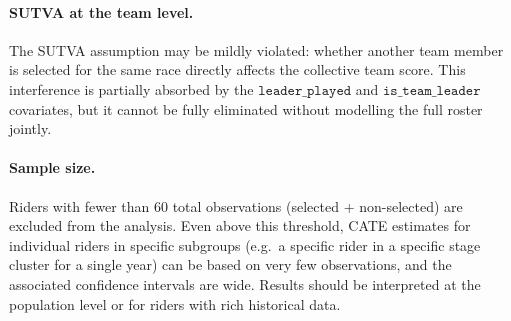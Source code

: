 \paragraph{SUTVA at the team level.} The SUTVA assumption may be mildly violated: whether another team member is selected for the same race directly affects the collective team score. This interference is partially absorbed by the $\texttt{leader\_played}$ and $\texttt{is\_team\_leader}$ covariates, but it cannot be fully eliminated without modelling the full roster jointly.

\paragraph{Sample size.} Riders with fewer than 60 total observations (selected + non-selected) are excluded from the analysis. Even above this threshold, CATE estimates for individual riders in specific subgroups (e.g.\ a specific rider in a specific stage cluster for a single year) can be based on very few observations, and the associated confidence intervals are wide. Results should be interpreted at the population level or for riders with rich historical data.
